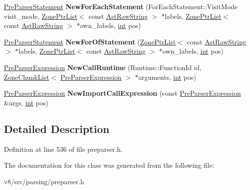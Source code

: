 \begin{DoxyCompactItemize}
\mbox{\hyperlink{classv8_1_1internal_1_1PreParserStatement}{Pre\+Parser\+Statement}} {\bfseries New\+For\+Each\+Statement} (For\+Each\+Statement\+::\+Visit\+Mode visit\+\_\+mode, \mbox{\hyperlink{classv8_1_1internal_1_1ZoneList}{Zone\+Ptr\+List}}$<$ const \mbox{\hyperlink{classv8_1_1internal_1_1AstRawString}{Ast\+Raw\+String}} $>$ $\ast$labels, \mbox{\hyperlink{classv8_1_1internal_1_1ZoneList}{Zone\+Ptr\+List}}$<$ const \mbox{\hyperlink{classv8_1_1internal_1_1AstRawString}{Ast\+Raw\+String}} $>$ $\ast$own\+\_\+labels, \mbox{\hyperlink{classint}{int}} pos)
\item 
\mbox{\label{classv8_1_1internal_1_1PreParserFactory_a018925592d17428868b25bf1e76a9c45}} 
\mbox{\hyperlink{classv8_1_1internal_1_1PreParserStatement}{Pre\+Parser\+Statement}} {\bfseries New\+For\+Of\+Statement} (\mbox{\hyperlink{classv8_1_1internal_1_1ZoneList}{Zone\+Ptr\+List}}$<$ const \mbox{\hyperlink{classv8_1_1internal_1_1AstRawString}{Ast\+Raw\+String}} $>$ $\ast$labels, \mbox{\hyperlink{classv8_1_1internal_1_1ZoneList}{Zone\+Ptr\+List}}$<$ const \mbox{\hyperlink{classv8_1_1internal_1_1AstRawString}{Ast\+Raw\+String}} $>$ $\ast$own\+\_\+labels, \mbox{\hyperlink{classint}{int}} pos)
\item 
\mbox{\label{classv8_1_1internal_1_1PreParserFactory_a0f9233f7862af694af452b715c9857f3}} 
\mbox{\hyperlink{classv8_1_1internal_1_1PreParserExpression}{Pre\+Parser\+Expression}} {\bfseries New\+Call\+Runtime} (Runtime\+::\+Function\+Id id, \mbox{\hyperlink{classv8_1_1internal_1_1ZoneChunkList}{Zone\+Chunk\+List}}$<$ \mbox{\hyperlink{classv8_1_1internal_1_1PreParserExpression}{Pre\+Parser\+Expression}} $>$ $\ast$arguments, \mbox{\hyperlink{classint}{int}} pos)
\item 
\mbox{\label{classv8_1_1internal_1_1PreParserFactory_ac5d225363ccafa1dfa728d6738081e6c}} 
\mbox{\hyperlink{classv8_1_1internal_1_1PreParserExpression}{Pre\+Parser\+Expression}} {\bfseries New\+Import\+Call\+Expression} (const \mbox{\hyperlink{classv8_1_1internal_1_1PreParserExpression}{Pre\+Parser\+Expression}} \&args, \mbox{\hyperlink{classint}{int}} pos)
\end{DoxyCompactItemize}


\subsection{Detailed Description}


Definition at line 536 of file preparser.\+h.



The documentation for this class was generated from the following file\+:\begin{DoxyCompactItemize}
\item 
v8/src/parsing/preparser.\+h\end{DoxyCompactItemize}

